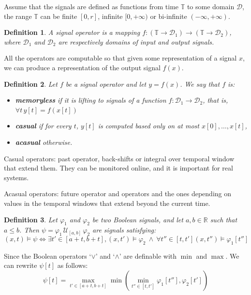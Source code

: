 \documentclass{suftesi}
\newtheorem*{definition}{Definition}
\renewcommand{\b}{\textbf}
\begin{document}
Assume that the signals are defined as functions from time $\mathbb{T}$ to some domain $\mathcal{D}$, the range $\mathbb{T}$ can be finite $[0, r]$, infinite $[0, +\infty)$ or bi-infinite $(-\infty, +\infty)$.

\begin{definition}
    A signal operator is a mapping $f: (\mathbb{T}\to\mathcal{D}_1)\to(\mathbb{T}\to\mathcal{D}_2)$, where $\mathcal{D}_1$ and $\mathcal{D}_2$ are respectively domains of input and output signals.
\end{definition}

All the operators are computable so that given some representation of a signal $x$, we can produce a representation of the output signal $f(x)$.

\begin{definition}
    Let $f$ be a signal operator and let $y=f(x)$. We say that $f$ is:
    \begin{itemize}[leftmargin=0.5cm]
        \item \b{memoryless} if it is lifting to signals of a function $f: \mathcal{D}_1\to\mathcal{D}_2$, that is, $\forall t\,y[t]=f(x[t])$
        \item \b{casual} if for every $t$, $y[t]$ is computed based only on at most $x[0],\dots, x[t]$,
        \item \b{acasual} otherwise.
    \end{itemize}
\end{definition}

Casual operators: past operator, back-shifts or integral over temporal window that extend them. They can be monitored online, and it is important for real systems.

Acasual operators: future operator and operators and the ones depending on values in the temporal windows that extend beyond the current time. 

\begin{definition}
    Let $\varphi_1$ and $\varphi_2$ be two Boolean signals, and let $a,b\in\mathbb{R}$ such that $a\leq b$. Then $\psi=\varphi_1\,\mathcal{U}_{[a,b]}\,\varphi_2$ are signals satisfying: $$(x,t)\vDash\psi \Leftrightarrow\exists t'\in [a+t,b+t], (x,t')\vDash\varphi_2\:\land \:\forall t''\in[t,t'](x,t'')\vDash\varphi_1[t'']$$ 
\end{definition}

Since the Boolean operators `$\lor$' and `$\land$' are definable with $\min$ and $\max$. We can rewrite $\psi[t]$ as follows:
$$\psi[t]=\max_{t'\in[a+t,b+t]}\min(\min_{t''\in[t,t']}\varphi_1[t''],\varphi_2[t'])$$
    
\end{document}
